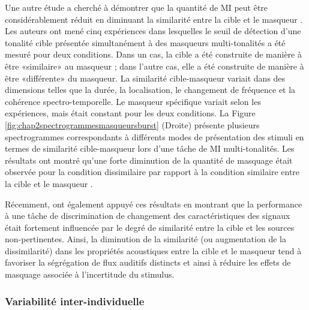 Une autre étude a cherché à démontrer que la quantité de MI peut être considérablement réduit en diminuant la similarité entre la cible et le masqueur \citep{durlach2003informational}. 
Les auteurs ont mené cinq expériences dans lesquelles le seuil de détection d'une tonalité cible présentée simultanément à des masqueurs multi-tonalités a été mesuré pour deux conditions. 
Dans un cas, la cible a été construite de manière à être «similaire» au masqueur ; dans l'autre cas, elle a été construite de manière à être «différente» du masqueur. 
La similarité cible-masqueur variait dans des dimensions telles que la durée, la localisation, le changement de fréquence et la cohérence spectro-temporelle. 
Le masqueur spécifique variait selon les expériences, mais était constant pour les deux conditions. 
La Figure \ref{fig:chap2spectrogrammesmasqueursburst} (Droite) présente plusieurs spectrogrammes correspondants à différents modes de présentation des stimuli en termes de similarité cible-masqueur lors d'une tâche de MI multi-tonalités. 
Les résultats ont montré qu'une forte diminution de la quantité de masquage était observée pour la condition dissimilaire par rapport à la condition similaire entre la cible et le masqueur \citep{durlach2003informational}. 

Récemment, \cite{dickerson2015sound} ont également appuyé ces résultats en montrant que la performance à une tâche de discrimination de changement des caractéristiques des signaux était fortement influencée par le degré de similarité entre la cible et les sources non-pertinentes.
Ainsi, la diminution de la similarité (ou augmentation de la dissimilarité) dans les propriétés acoustiques entre la cible et le masqueur tend à favoriser la ségrégation de flux auditifs distincts et ainsi à réduire les effets de masquage associée à l'incertitude du stimulus.

\subsubsection{Variabilité inter-individuelle}
\label{masquageinformationnelvariabilité}

